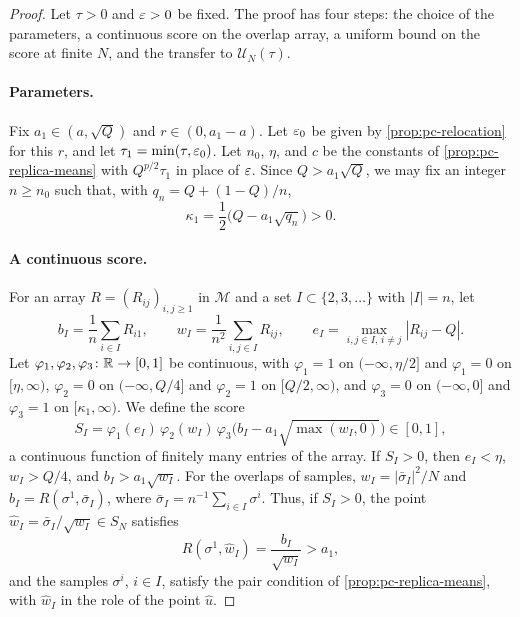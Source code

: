 \begin{proof}
Let $\tau>0$ and $\varepsilon>0$ be fixed. The proof has four steps: the choice of the parameters, a continuous score on the overlap array, a uniform bound on the score at finite $N$, and the transfer to $\mathcal U_N(\tau)$.

\paragraph{Parameters.}
Fix $a_1\in(a,\sqrt Q)$ and $r\in(0,a_1-a)$. Let $\varepsilon_0$ be given by \cref{prop:pc-relocation} for this $r$, and let $\tau_1=\min(\tau,\varepsilon_0)$. Let $n_0$, $\eta$, and $c$ be the constants of \cref{prop:pc-replica-means} with $Q^{p/2}\tau_1$ in place of $\varepsilon$. Since $Q>a_1\sqrt Q$, we may fix an integer $n\ge n_0$ such that, with $q_n=Q+(1-Q)/n$,
\begin{equation}\label{eq:pc-training}
\kappa_1=\frac12\bigl(Q-a_1\sqrt{q_n}\bigr)>0.
\end{equation}

\paragraph{A continuous score.}
For an array $R=(R_{ij})_{i,j\ge1}$ in $\mathcal M$ and a set $I\subset\{2,3,\dots\}$ with $|I|=n$, let
\[
b_I=\frac1n\sum_{i\in I}R_{i1},\qquad w_I=\frac1{n^2}\sum_{i,j\in I}R_{ij},\qquad e_I=\max_{i,j\in I,\,i\ne j}|R_{ij}-Q|.
\]
Let $\varphi_1,\varphi_2,\varphi_3\colon\mathbb R\to[0,1]$ be continuous, with $\varphi_1=1$ on $(-\infty,\eta/2]$ and $\varphi_1=0$ on $[\eta,\infty)$, $\varphi_2=0$ on $(-\infty,Q/4]$ and $\varphi_2=1$ on $[Q/2,\infty)$, and $\varphi_3=0$ on $(-\infty,0]$ and $\varphi_3=1$ on $[\kappa_1,\infty)$. We define the score
\[
S_I=\varphi_1(e_I)\,\varphi_2(w_I)\,\varphi_3\bigl(b_I-a_1\sqrt{\max(w_I,0)}\bigr)\in[0,1],
\]
a continuous function of finitely many entries of the array. If $S_I>0$, then $e_I<\eta$, $w_I>Q/4$, and $b_I>a_1\sqrt{w_I}$. For the overlaps of samples, $w_I=|\bar\sigma_I|^2/N$ and $b_I=R(\sigma^1,\bar\sigma_I)$, where $\bar\sigma_I=n^{-1}\sum_{i\in I}\sigma^i$. Thus, if $S_I>0$, the point $\hat w_I=\bar\sigma_I/\sqrt{w_I}\in S_N$ satisfies
\begin{equation}\label{eq:pc-score}
R(\sigma^1,\hat w_I)=\frac{b_I}{\sqrt{w_I}}>a_1,
\end{equation}
and the samples $\sigma^i$, $i\in I$, satisfy the pair condition of \cref{prop:pc-replica-means}, with $\hat w_I$ in the role of the point $\hat u$.


\end{proof}
